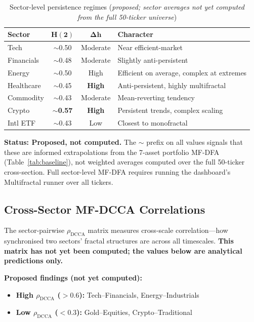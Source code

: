 \documentclass[11pt,a4paper]{article}
\begin{document}
\begin{table}[H]
\centering
\caption{Sector-level persistence regimes (\textit{proposed; sector averages not yet computed from the full 50-ticker universe})}
\begin{tabular}{lccp{5cm}}
\toprule
\textbf{Sector} & $\boldsymbol{H(2)}$ & $\boldsymbol{\Delta h}$ & \textbf{Character} \\
\midrule
Tech        & $\sim$0.50 & Moderate & Near efficient-market \\
Financials  & $\sim$0.48 & Moderate & Slightly anti-persistent \\
Energy      & $\sim$0.50 & High     & Efficient on average, complex at extremes \\
Healthcare  & $\sim$0.45 & \textbf{High} & Anti-persistent, highly multifractal \\
Commodity   & $\sim$0.43 & Moderate & Mean-reverting tendency \\
Crypto      & $\sim$\textbf{0.57} & \textbf{High} & Persistent trends, complex scaling \\
Intl ETF    & $\sim$0.43 & Low      & Closest to monofractal \\
\bottomrule
\end{tabular}
\end{table}

\begin{warningbox}
\textbf{Status: Proposed, not computed.} The $\sim$ prefix on all values signals that these are informed extrapolations from the 7-asset portfolio MF-DFA (Table~\ref{tab:baseline}), not weighted averages computed over the full 50-ticker cross-section. Full sector-level MF-DFA requires running the dashboard's Multifractal runner over all tickers.
\end{warningbox}

\subsection{Cross-Sector MF-DCCA Correlations}

The sector-pairwise $\rho_{\text{DCCA}}$ matrix measures cross-scale correlation---how synchronised two sectors' fractal structures are across all timescales. \textbf{This matrix has not yet been computed; the values below are analytical predictions only.}

\textbf{Proposed findings (not yet computed):}
\begin{itemize}[nosep]
\item \textbf{High $\rho_{\text{DCCA}}$ ($>0.6$):} Tech--Financials, Energy--Industrials
\item \textbf{Low $\rho_{\text{DCCA}}$ ($<0.3$):} Gold--Equities, Crypto--Traditional
\end{itemize}
\end{document}

